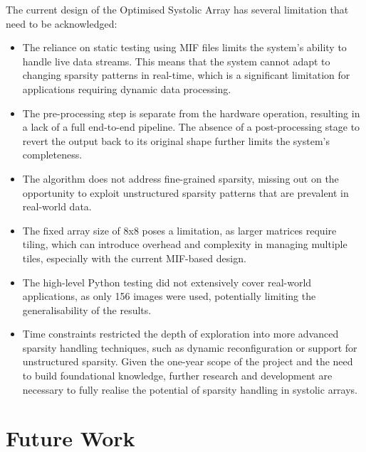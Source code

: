 \documentclass[12pt, a4paper, ukenglish]{article}
\begin{document}
    The current design of the Optimised Systolic Array has several limitation that need to be acknowledged:
    \begin{itemize}
        \item The reliance on static testing using MIF files limits the system's ability to handle live data streams. This means that the system cannot adapt to changing sparsity patterns in real-time, which is a significant limitation for applications requiring dynamic data processing.
        \item The pre-processing step is separate from the hardware operation, resulting in a lack of a full end-to-end pipeline. The absence of a post-processing stage to revert the output back to its original shape further limits the system's completeness.
        \item The algorithm does not address fine-grained sparsity, missing out on the opportunity to exploit unstructured sparsity patterns that are prevalent in real-world data.
        \item The fixed array size of 8x8 poses a limitation, as larger matrices require tiling, which can introduce overhead and complexity in managing multiple tiles, especially with the current MIF-based design.
        \item The high-level Python testing did not extensively cover real-world applications, as only 156 images were used, potentially limiting the generalisability of the results.
        \item Time constraints restricted the depth of exploration into more advanced sparsity handling techniques, such as dynamic reconfiguration or support for unstructured sparsity. Given the one-year scope of the project and the need to build foundational knowledge, further research and development are necessary to fully realise the potential of sparsity handling in systolic arrays.
    \end{itemize}

\section{Future Work} \label{sec: future work}
\end{document}
